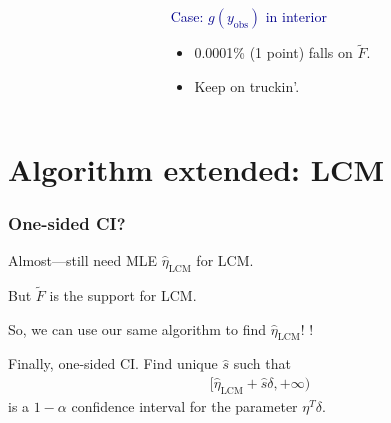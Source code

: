 \documentclass[ 10pt]{beamer}
\newcommand{\etaLCM}{\hat{\eta}_{\textrm{LCM}}}
\newcommand{\yobs}{y_{\text{obs}}}
\begin{document}
{\begin{columns}[]
\begin{column}[T]{0.22\textwidth}

\end{column}

\begin{column}[t]{0.78\textwidth}

\pause
\textcolor{darkblue}{Case: $g(\yobs)$ in interior}
\begin{itemize}
\item 0.0001\% (1 point) falls on $\tilde{F}$.
\item  Keep on truckin'.
\end{itemize}
\end{column}

\end{columns}

}

%

\section{Algorithm extended: LCM}
\frame
{
\frametitle{One-sided CI?}  
Almost---still need MLE $\etaLCM$ for LCM.
\vspace{1mm}
\pause

But $\tilde{F}$ is the support for LCM.
\vspace{1mm}

So, we can use our same algorithm to find $\etaLCM$!   \alert{\checkmark}!
\vspace{8mm}

Finally, one-sided CI.
Find unique $\hat{s}$ such that
\begin{align*}
[ \etaLCM + \hat{s} \delta, + \infty)
\end{align*}
is a $1- \alpha$ confidence interval for the parameter $\eta^T\delta$.

}
\end{document}
